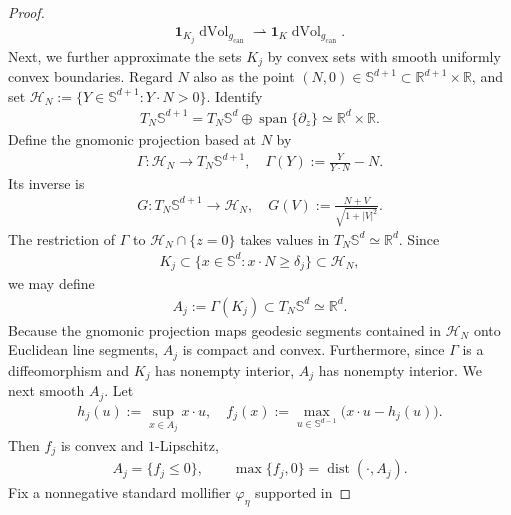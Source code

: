 \documentclass[10pt,a4paper]{amsart}
\def\bR {\mathbb{R}}
\def\bS {\mathbb{S}}
\def\cH {\mathcal{H}}
\newcommand{\can}{\mathrm{can}}
\newcommand{\dist}{\operatorname{dist}}
\newcommand{\dvol}{\operatorname{dVol}}
\newcommand{\wto}{\rightharpoonup}
\begin{document}
\begin{proof}
\begin{align}\label{eq:hemisphere-pancake-truncation-limit}
        \mathbf{1}_{K_j}\dvol_{g_{\can}}
        \wto
        \mathbf{1}_K\dvol_{g_{\can}}.
\end{align}
Next, we further approximate the sets $K_j$ by convex sets with smooth uniformly
convex boundaries. Regard $N$ also as the point $(N,0)\in\bS^{d+1}\subset\bR^{d+1}\times\bR$,
and set $\cH_N:=\{Y\in\bS^{d+1}:Y\cdot N>0\}.$ Identify
\begin{align}
        T_N\bS^{d+1}
        =
        T_N\bS^d\oplus\operatorname{span}\{\partial_z\}
        \simeq
        \bR^d\times\bR.
\end{align}
Define the gnomonic projection based at $N$ by
\begin{align}
        \Gamma:\cH_N
        \rightarrow
        T_N\bS^{d+1},\quad 
        \Gamma(Y)
        :=
        \frac{Y}{Y\cdot N}-N.
\end{align}
Its inverse is
\begin{align}
        G:T_N\bS^{d+1}
        \rightarrow
        \cH_N,\quad 
        G(V)
        :=
        \frac{N+V}{\sqrt{1+|V|^2}}.
\end{align}
The restriction of $\Gamma$ to
$\cH_N\cap\{z=0\}$ takes values in
$T_N\bS^d\simeq\bR^d$. Since
\begin{align}
        K_j
        \subset
        \{x\in\bS^d:x\cdot N\geq\delta_j\}
        \subset
        \cH_N,
\end{align}
we may define
\begin{align}
        A_j
        :=
        \Gamma(K_j)
        \subset
        T_N\bS^d
        \simeq
        \bR^d.
\end{align}
Because the gnomonic projection maps geodesic segments contained in
$\cH_N$ onto Euclidean line segments, $A_j$ is compact and convex.
Furthermore, since $\Gamma$ is a diffeomorphism and $K_j$ has nonempty
interior, $A_j$ has nonempty interior. We next smooth $A_j$. Let
\begin{align}
        h_j(u)
        :=
        \sup_{x\in A_j}x\cdot u,
        \quad 
        f_j(x)
        :=
        \max_{u\in\bS^{d-1}}\bigl(x\cdot u-h_j(u)\bigr).
\end{align}
Then $f_j$ is convex and $1$-Lipschitz,
\begin{align}
        A_j
        =
        \{f_j\leq0\},
        \qquad
        \max\{f_j,0\}
        =
        \dist(\cdot,A_j).
\end{align}
Fix a nonnegative standard mollifier $\varphi_\eta$ supported in

\end{proof}
\end{document}
